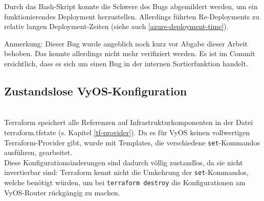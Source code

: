 Durch das Bash-Skript konnte die Schwere des Bugs abgemildert werden, um ein funktionierendes Deployment herzustellen. Allerdings führten Re-Deployments zu relativ langen \gls{Deployment}-Zeiten (siehe auch \ref{azure-deployment-time}).

Anmerkung: Dieser Bug wurde angeblich noch kurz vor Abgabe dieser Arbeit behoben. Das konnte allerdings nicht mehr verifiziert werden. Es ist im Commit ersichtlich, dass es sich um einen Bug in der internen Sortierfunktion handelt.\cite{awsfixtf2021}

\subsection{Zustandslose VyOS-Konfiguration}\\
Terraform speichert alle Referenzen auf Infrastrukturkomponenten in der Datei terraform.tfstate (s. Kapitel \ref{tf-provider}). Da es für VyOS keinen vollwertigen Terraform-Provider gibt, wurde mit Templates, die verschiedene \texttt{set}-Kommandos ausführen, gearbeitet.\\
Diese Konfigurationsänderungen sind dadurch völlig zustandlos, da sie nicht invertierbar sind: Terraform kennt nicht die Umkehrung der \texttt{set}-Kommandos, welche benötigt würden, um bei \texttt{terraform destroy} die Konfigurationen am VyOS-Router rückgängig zu machen.

